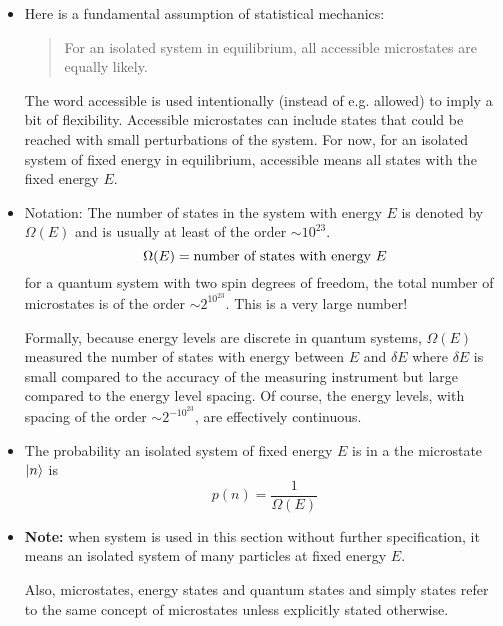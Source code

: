 \documentclass[11pt, a4paper]{article}
\begin{document}
\begin{itemize}
	\item Here is a fundamental assumption of statistical mechanics:
	\begin{quote}
		For an isolated system in equilibrium, all accessible microstates are equally likely.
	\end{quote}
	The word accessible is used intentionally (instead of e.g. allowed) to imply a bit of flexibility. Accessible microstates can include states that could be reached with small perturbations of the system. For now, for an isolated system of fixed energy in equilibrium, accessible means all states with the fixed energy $ E $.
	
	\item Notation: The number of states in the system with energy $ E $ is denoted by $ \Omega(E) $ and is usually at least of the order $ \sim 10^{23} $.
	\begin{equation*}
		\Omega(E) = \text{number of states with energy $ E $}
	\end{equation*}
	for a quantum system with two spin degrees of freedom, the total number of microstates is of the order $ \sim 2^{10^{23}} $. This is a very large number!
	
	Formally, because energy levels are discrete in quantum systems, $ \Omega(E) $ measured the number of states with energy between $ E $ and $ \delta E $ where $ \delta E $ is small compared to the accuracy of the measuring instrument but large compared to the energy level spacing. Of course, the energy levels, with spacing of the order $ \sim 2^{-10^{23}} $, are effectively continuous.
	
	
	\item The probability an isolated system of fixed energy $ E $ is in a the microstate $ \ket{n} $ is 
	\begin{equation*}
		p(n) = \frac{1}{\Omega(E)}
	\end{equation*}
	
	\item \textbf{Note:} when system is used in this section without further specification, it means an isolated system of many particles at fixed energy $ E $.
	
	Also, microstates, energy states and quantum states and simply states refer to the same concept of microstates unless explicitly stated otherwise.
\end{itemize}
\end{document}
